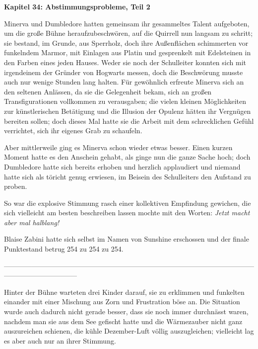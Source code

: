 

\hypertarget{abstimmungsprobleme-teil-2}{%

\textbf{Kapitel 34: Abstimmungsprobleme, Teil 2}

\hfill\break Minerva und Dumbledore hatten gemeinsam ihr gesammeltes Talent aufgeboten, um die große Bühne heraufzubeschwören, auf die Quirrell nun langsam zu schritt; sie bestand, im Grunde, aus Sperrholz, doch ihre Außenflächen schimmerten vor funkelndem Marmor, mit Einlagen aus Platin und gesprenkelt mit Edelsteinen in den Farben eines jeden Hauses. Weder sie noch der Schulleiter konnten sich mit irgendeinem der Gründer von Hogwarts messen, doch die Beschwörung musste auch nur wenige Stunden lang halten. Für gewöhnlich erfreute Minerva sich an den seltenen Anlässen, da sie die Gelegenheit bekam, sich an großen Transfigurationen vollkommen zu verausgaben; die vielen kleinen Möglichkeiten zur künstlerischen Betätigung und die Illusion der Opulenz hätten ihr Vergnügen bereiten sollen; doch dieses Mal hatte sie die Arbeit mit dem schrecklichen Gefühl verrichtet, sich ihr eigenes Grab zu schaufeln.

Aber mittlerweile ging es Minerva schon wieder etwas besser. Einen kurzen Moment hatte es den Anschein gehabt, als ginge nun die ganze Sache hoch; doch Dumbledore hatte sich bereits erhoben und herzlich applaudiert und niemand hatte sich als töricht genug erwiesen, im Beisein des Schulleiters den Aufstand zu proben.

So war die explosive Stimmung rasch einer kollektiven Empfindung gewichen, die sich vielleicht am besten beschreiben lassen mochte mit den Worten: \emph{Jetzt macht aber mal halblang!}

Blaise Zabini hatte sich selbst im Namen von Sunshine erschossen und der finale Punktestand betrug 254 zu 254 zu 254.

--------------------------------------------------------------------------------------------------------------------------------------------

\hfill\break Hinter der Bühne warteten drei Kinder darauf, sie zu erklimmen und funkelten einander mit einer Mischung aus Zorn und Frustration böse an. Die Situation wurde auch dadurch nicht gerade besser, dass sie noch immer durchnässt waren, nachdem man sie aus dem See gefischt hatte und die Wärmezauber nicht ganz auszureichen schienen, die kühle Dezember-Luft völlig auszugleichen; vielleicht lag es aber auch nur an ihrer Stimmung.

}
